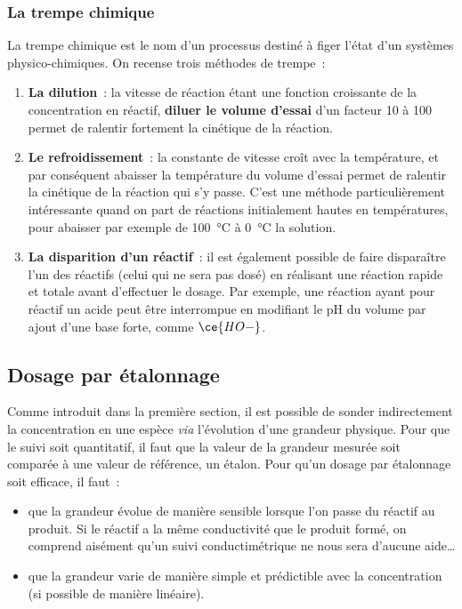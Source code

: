 \documentclass[../../main/main.tex]{subfiles}
\begin{document}
\subsubsection{La trempe chimique}
La trempe chimique est le nom d'un processus destiné à figer l'état d'un
systèmes physico-chimiques. On recense trois méthodes de trempe~:
\begin{enumerate}
	\item \textbf{La dilution}~: la vitesse de réaction étant une fonction
	      croissante de la concentration en réactif, \textbf{diluer le volume
		      d'essai} d'un facteur 10 à 100 permet de ralentir fortement la cinétique
	      de la réaction.
	\item \textbf{Le refroidissement}~: la constante de vitesse croît avec la
	      température, et par conséquent abaisser la température du volume d'essai
	      permet de ralentir la cinétique de la réaction qui s'y passe. C'est une
	      méthode particulièrement intéressante quand on part de réactions
	      initialement hautes en températures, pour abaisser par exemple de
	      \SI{100}{\degreeCelsius} à \SI{0}{\degreeCelsius} la solution.
	\item \textbf{La disparition d'un réactif}~: il est également possible de
	      faire disparaître l'un des réactifs (celui qui ne sera pas dosé) en
	      réalisant une réaction rapide et totale avant d'effectuer le dosage. Par
	      exemple, une réaction ayant pour réactif un acide peut être interrompue
	      en modifiant le pH du volume par ajout d'une base forte, comme
	      $\ce{HO-}$.
\end{enumerate}

\subsection{Dosage par étalonnage}
Comme introduit dans la première section, il est possible de sonder
indirectement la concentration en une espèce \textit{via} l'évolution d'une
grandeur physique. Pour que le suivi soit quantitatif, il faut que la valeur de
la grandeur mesurée soit comparée à une valeur de référence, un étalon. Pour
qu'un dosage par étalonnage soit efficace, il faut~:
\begin{itemize}
	\item que la grandeur évolue de manière sensible lorsque l'on passe du
	      réactif au produit. Si le réactif a la même conductivité que le produit
	      formé, on comprend aisément qu'un suivi conductimétrique ne nous sera
	      d'aucune aide…
	\item que la grandeur varie de manière simple et prédictible avec la
	      concentration (si possible de manière linéaire).
\end{itemize}
\end{document}
